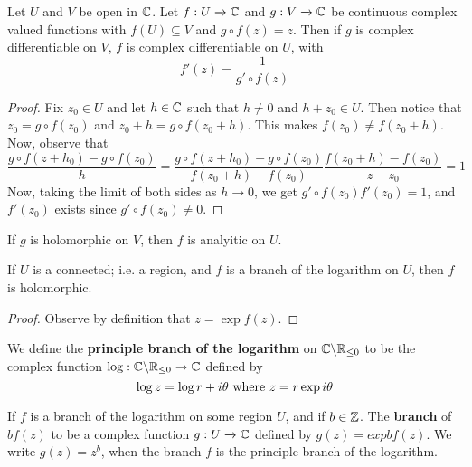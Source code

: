 \begin{lemma}\label{3.2.7}
    Let $U$ and  $V$ be open in  $\mathbb{C}$. Let  $f:U \xrightarrow{} \mathbb{C}$ and $g:V
    \xrightarrow{} \mathbb{C}$ be continuous complex valued functions with $f(U)
    \subseteq V$ and $g \circ f(z)=z$. Then if $g$ is complex differentiable on
    $V$, $f$ is complex differentiable on  $U$, with
    \begin{equation*}
        f'(z)=\frac{1}{g' \circ f(z)}
    \end{equation*}
\end{lemma}
\begin{proof}
    Fix $z_0 \in U$ and let $h \in \mathbb{C}$ such that  $h \neq 0$ and  $h+z_0 \in U$.
    Then notice that $z_0=g \circ f(z_0)$ and $z_0+h=g \circ f(z_0+h)$. This
    makes $f(z_0) \neq f(z_0+h)$. Now, observe that
    \begin{equation*}
        \frac{g \circ f(z+h_0)-g \circ f(z_0)}{h}=
        \frac{g \circ f(z+h_0)-g \circ
        f(z_0)}{f(z_0+h)-f(z_0)}\frac{f(z_0+h)-f(z_0)}{z-z_0}=1
    \end{equation*}
    Now, taking the limit of both sides as $h \xrightarrow{} 0$, we get $g'
    \circ f(z_0)f'(z_0)=1$, and $f'(z_0)$ exists since $g' \circ f(z_0) \neq 0$.
\end{proof}
\begin{corollary}
    If $g$ is holomorphic on  $V$, then  $f$ is analyitic on  $U$.
\end{corollary}
\begin{corollary}
    If $U$ is a connected; i.e. a region, and $f$ is a branch of the logarithm
    on  $U$, then  $f$ is holomorphic.
\end{corollary}
\begin{proof}
    Observe by definition that $z=\exp{f(z)}$.
\end{proof}

\begin{definition}
    We define the \textbf{principle branch of the logarithm} on
    $\mathbb{C} \backslash \mathbb{R}_{\leq 0}$ to be the complex function
    $\log:\mathbb{C} \backslash \mathbb{R}_{\leq 0} \xrightarrow{} \mathbb{C}$ defined by
    \begin{equation*}
        \log{z}=\log{r}+i\theta \text{ where }z=r\exp{i\theta}
    \end{equation*}
\end{definition}

\begin{definition}
    If $f$ is a branch of the logarithm on some region  $U$, and if  $b \in \mathbb{Z}$.
    The \textbf{branch} of $bf(z)$ to be a complex function $g:U \xrightarrow{}
    \mathbb{C}$ defined by $g(z)=exp{bf(z)}$. We write $g(z)=z^b$, when the branch $f$
    is the principle branch of the logarithm.
\end{definition}

